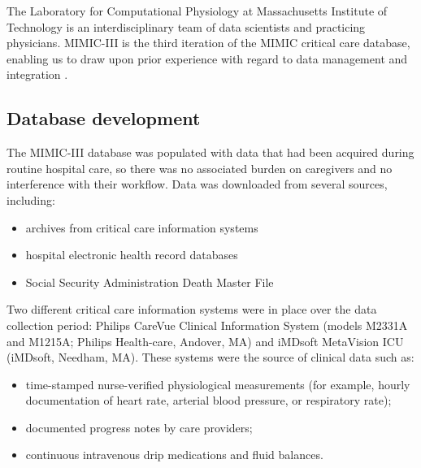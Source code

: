 \documentclass[english]{article}
\begin{document}
The Laboratory for Computational Physiology at Massachusetts Institute of Technology is an interdisciplinary team of data scientists and practicing physicians. MIMIC-III is the third iteration of the MIMIC critical care database, enabling us to draw upon prior experience with regard to data management and integration \cite{cite3}.

\subsection*{Database development}

The MIMIC-III database was populated with data that had been acquired during routine hospital care, so there was no associated burden on caregivers and no interference with their workflow. Data was downloaded from several sources, including:
\begin{itemize}
  \item archives from critical care information systems
  \item hospital electronic health record databases
  \item Social Security Administration Death Master File
\end{itemize}
Two different critical care information systems were in place over the data collection period: Philips CareVue Clinical Information System (models M2331A and M1215A; Philips Health-care, Andover, MA) and iMDsoft MetaVision ICU (iMDsoft, Needham, MA). These systems were the source of clinical data such as:
\begin{itemize}
  \item time-stamped nurse-verified physiological measurements (for example, hourly documentation of heart rate, arterial blood pressure, or respiratory rate);
  \item documented progress notes by care providers;
  \item continuous intravenous drip medications and fluid balances.
\end{itemize}
\end{document}
